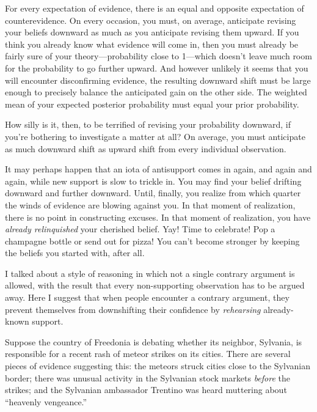 {
 For every expectation of evidence, there is an equal and opposite
expectation of counterevidence. On every occasion, you must, on
average, anticipate revising your beliefs downward as much as you
anticipate revising them upward. If you think you already know what
evidence will come in, then you must already be fairly sure of your
theory---probability close to 1---which doesn't leave
much room for the probability to go further upward. And however
unlikely it seems that you will encounter disconfirming evidence, the
resulting downward shift must be large enough to precisely balance the
anticipated gain on the other side. The weighted mean of your expected
posterior probability must equal your prior probability.}

{
 How silly is it, then, to be terrified of revising your
probability downward, if you're bothering to
investigate a matter at all? On average, you must anticipate as much
downward shift as upward shift from every individual observation.}

{
 It may perhaps happen that an iota of antisupport comes in again,
and again and again, while new support is slow to trickle in. You may
find your belief drifting downward and further downward. Until,
finally, you realize from which quarter the winds of evidence are
blowing against you. In that moment of realization, there is no point
in constructing excuses. In that moment of realization, you have
\textit{already relinquished} your cherished belief. Yay! Time to
celebrate! Pop a champagne bottle or send out for pizza! You
can't become stronger by keeping the beliefs you
started with, after all.}

\myendsectiontext


{
 I talked about a style of reasoning in which not a single contrary
argument is allowed, with the result that every non-supporting
observation has to be argued away. Here I suggest that when people
encounter a contrary argument, they prevent themselves from
downshifting their confidence by \textit{rehearsing} already-known
support. }

{
 Suppose the country of Freedonia is debating whether its neighbor,
Sylvania, is responsible for a recent rash of meteor strikes on its
cities. There are several pieces of evidence suggesting this: the
meteors struck cities close to the Sylvanian border; there was unusual
activity in the Sylvanian stock markets \textit{before} the strikes;
and the Sylvanian ambassador Trentino was heard muttering about
``heavenly vengeance.''}

